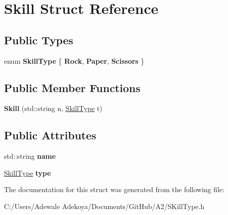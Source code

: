 \hypertarget{struct_skill}{}\section{Skill Struct Reference}
\label{struct_skill}
\subsection*{Public Types}
\begin{DoxyCompactItemize}
\item 
\hypertarget{struct_skill_a460934d44040fda3fdbb9aff24cfe80f}{}enum {\bfseries Skill\+Type} \{ {\bfseries Rock}, 
{\bfseries Paper}, 
{\bfseries Scissors}
 \}\label{struct_skill_a460934d44040fda3fdbb9aff24cfe80f}

\end{DoxyCompactItemize}
\subsection*{Public Member Functions}
\begin{DoxyCompactItemize}
\item 
\hypertarget{struct_skill_a78a3b5201189083059e568bdef2606a2}{}{\bfseries Skill} (std\+::string n, \hyperlink{class_skill_type}{Skill\+Type} t)\label{struct_skill_a78a3b5201189083059e568bdef2606a2}

\end{DoxyCompactItemize}
\subsection*{Public Attributes}
\begin{DoxyCompactItemize}
\item 
\hypertarget{struct_skill_a1271744546e69259d6ac31013900c49e}{}std\+::string {\bfseries name}\label{struct_skill_a1271744546e69259d6ac31013900c49e}

\item 
\hypertarget{struct_skill_a8deae6639996545a133cf1b17d082425}{}\hyperlink{class_skill_type}{Skill\+Type} {\bfseries type}\label{struct_skill_a8deae6639996545a133cf1b17d082425}

\end{DoxyCompactItemize}


The documentation for this struct was generated from the following file\+:\begin{DoxyCompactItemize}
\item 
C\+:/\+Users/\+Adewale Adekoya/\+Documents/\+Git\+Hub/\+A2/S\+Kill\+Type.\+h\end{DoxyCompactItemize}
